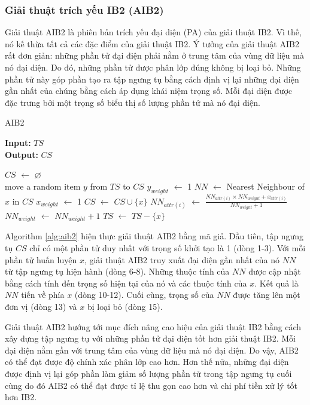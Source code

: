 \documentclass[13pt,oneside]{scrbook}
\newcommand*\Let[2]{\State #1 $\gets$ #2}
\let\emptyset\varnothing
\begin{document}
\subsubsection{Giải thuật trích yếu IB2 (AIB2)}
Giải thuật AIB2 là phiên bản trích yếu đại diện (PA) của giải thuật IB2.
Vì thế, nó kế thừa tất cả các đặc điểm của giải thuật IB2.
Ý tưởng của giải thuật AIB2 rất đơn giản: những phần tử đại điện phải nằm ở trung tâm của vùng dữ liệu mà nó đại diện.
Do đó, những phần tử được phân lớp đúng không bị loại bỏ. 
Những phần tử này góp phần tạo ra tập ngưng tụ bằng cách định vị lại những đại diện gần nhất của chúng bằng cách áp dụng khái niệm trọng số.
Mỗi đại diện được đặc trưng bởi một trọng số biểu thị số lượng phần tử mà nó đại diện.
\begin{algorithm}[h!]
  \caption{AIB2
   \label{alg:aib2}}
    \textbf{Input:} $TS$\\
    \textbf{Output:} $CS$
  \begin{algorithmic}[1]
      \Let{$CS$}{$\emptyset$}
      \\{move a random item $y$ from $TS$ to $CS$}
      \Let{$y_{weight}$}{1}
           \Let{$NN$}{Nearest Neighbour of $x$ in $CS$}
             \Let{$x_{weight}$}{1}
             \Let{$CS$}{$CS \cup \{x\}$}
           \Else
             \Let{$NN_{attr(i)}$}{$\frac{NN_{attr(i)} \times NN_{weight}+x_{attr(i)}}{NN_{weight}+1}$}
             \EndFor
             \Let{$NN_{weight}$}{$NN_{weight} + 1$}
           \EndIf
           \Let{$TS$}{$TS-\{x\}$}
          \EndFor
       \State {}
  \end{algorithmic}
\end{algorithm}

Algorithm \ref{alg:aib2} hiện thực giải thuật AIB2 bằng mã giả.
Đầu tiên, tập ngưng tụ $CS$ chỉ có một phần tử duy nhất với trọng số khởi tạo là 1 (dòng 1-3).
Với mỗi phần tử huấn luyện $x$, giải thuật AIB2 truy xuất đại diện gần nhất của nó $NN$ từ tập ngưng tụ hiện hành (dòng 6-8).
Những thuộc tính của $NN$ được cập nhật bằng cách tính đến trọng số hiện tại của nó và các thuộc tính của $x$.
Kết quả là $NN$ tiến về phía $x$ (dòng 10-12). 
Cuối cùng, trọng số của $NN$ được tăng lên một đơn vị (dòng 13) và $x$ bị loại bỏ (dòng 15).

Giải thuật AIB2 hướng tới mục đích nâng cao hiệu của giải thuật IB2 bằng cách xây dựng tập ngưng tụ với những phần tử đại diện tốt hơn giải thuật IB2.
Mỗi đại diện nằm gần với trung tâm của vùng dữ liệu mà nó đại diện.
Do vậy, AIB2 có thể đạt được độ chính xác phân lớp cao hơn.
Hơn thế nữa, những đại diện được định vị lại góp phần làm giảm số lượng phần tử trong tập ngưng tụ cuối cùng do đó AIB2 có thể đạt được tỉ lệ thu gọn cao hơn và chi phí tiền xử lý tốt hơn IB2.
\end{document}
